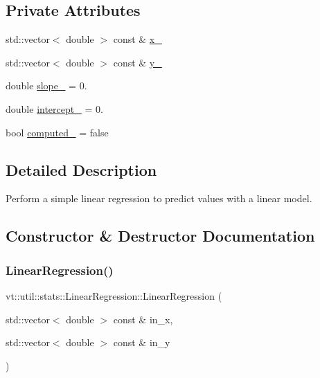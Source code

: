 \subsection*{Private Attributes}
\begin{DoxyCompactItemize}
\item 
std\+::vector$<$ double $>$ const  \& \hyperlink{structvt_1_1util_1_1stats_1_1_linear_regression_a46208bdabbdb35abead50111765242df}{x\+\_\+}
\item 
std\+::vector$<$ double $>$ const  \& \hyperlink{structvt_1_1util_1_1stats_1_1_linear_regression_acf0f3fc5c18fae9943d03c3f507f8acb}{y\+\_\+}
\item 
double \hyperlink{structvt_1_1util_1_1stats_1_1_linear_regression_a855d9e0f0470f875387f8490428e9acd}{slope\+\_\+} = 0.
\item 
double \hyperlink{structvt_1_1util_1_1stats_1_1_linear_regression_a1228e3f973040a4b30a015c50cc6481b}{intercept\+\_\+} = 0.
\item 
bool \hyperlink{structvt_1_1util_1_1stats_1_1_linear_regression_a4c87edbed1fca305b729e037c3c760f3}{computed\+\_\+} = false
\end{DoxyCompactItemize}


\subsection{Detailed Description}
Perform a simple linear regression to predict values with a linear model. 

\subsection{Constructor \& Destructor Documentation}
\mbox{\label{structvt_1_1util_1_1stats_1_1_linear_regression_a5ee7e2cca72dbd2d06acbd86529e40b4}} 
\subsubsection{\texorpdfstring{Linear\+Regression()}{LinearRegression()}}
{\footnotesize\ttfamily vt\+::util\+::stats\+::\+Linear\+Regression\+::\+Linear\+Regression (\begin{DoxyParamCaption}\item[{std\+::vector$<$ double $>$ const \&}]{in\+\_\+x,  }\item[{std\+::vector$<$ double $>$ const \&}]{in\+\_\+y }\end{DoxyParamCaption})\hspace{0.3cm}{\ttfamily [inline]}}




